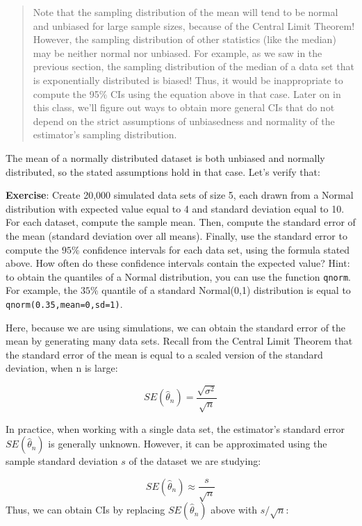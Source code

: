 \documentclass[
]{book}
\begin{document}
\begin{quote}
Note that the sampling distribution of the mean will tend to be normal and unbiased for large sample sizes, because of the Central Limit Theorem! However, the sampling distribution of other statistics (like the median) may be neither normal nor unbiased. For example, as we saw in the previous section, the sampling distribution of the median of a data set that is exponentially distributed is biased! Thus, it would be inappropriate to compute the 95\% CIs using the equation above in that case. Later on in this class, we'll figure out ways to obtain more general CIs that do not depend on the strict assumptions of unbiasedness and normality of the estimator's sampling distribution.
\end{quote}

The mean of a normally distributed dataset is both unbiased and normally distributed, so the stated assumptions hold in that case. Let's verify that:

\textbf{Exercise}: Create 20,000 simulated data sets of size 5, each drawn from a Normal distribution with expected value equal to 4 and standard deviation equal to 10. For each dataset, compute the sample mean. Then, compute the standard error of the mean (standard deviation over all means). Finally, use the standard error to compute the \(95\%\) confidence intervals for each data set, using the formula stated above. How often do these confidence intervals contain the expected value? Hint: to obtain the quantiles of a Normal distribution, you can use the function \texttt{qnorm}. For example, the \(35\%\) quantile of a standard Normal(0,1) distribution is equal to \texttt{qnorm(0.35,mean=0,sd=1)}.

Here, because we are using simulations, we can obtain the standard error of the mean by generating many data sets. Recall from the Central Limit Theorem that the standard error of the mean is equal to a scaled version of the standard deviation, when n is large:

\[SE(\hat{\theta}_n) = \frac{\sqrt{\sigma^2}}{\sqrt{n}}\]

In practice, when working with a single data set, the estimator's standard error \(SE(\hat{\theta}_n)\) is generally unknown. However, it can be approximated using the sample standard deviation \(s\) of the dataset we are studying:

\[SE(\hat{\theta}_n) \approx \frac{s}{\sqrt{n}}\]
Thus, we can obtain CIs by replacing \(SE(\hat{\theta}_n)\) above with \(s/\sqrt{n}\):
\end{document}
